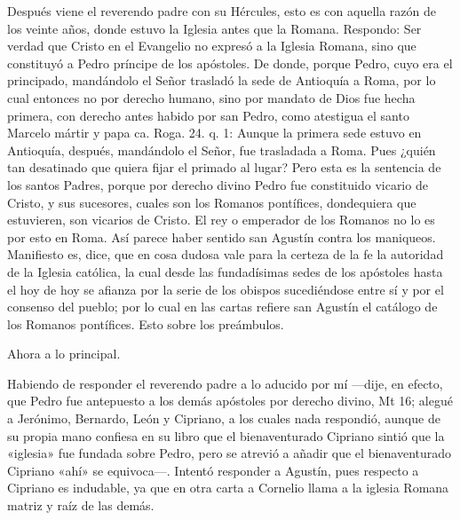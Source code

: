 Después viene el reverendo padre con su Hércules, esto es con aquella razón de los veinte años, donde estuvo la Iglesia antes que la Romana. Respondo: Ser verdad que Cristo en el Evangelio no expresó a la Iglesia Romana, sino que constituyó a Pedro príncipe de los apóstoles. De donde, porque Pedro, cuyo era el principado, mandándolo el Señor trasladó la sede de Antioquía a Roma, por lo cual entonces no por derecho humano, sino por mandato de Dios fue hecha primera, con derecho antes habido por san Pedro, como atestigua el santo Marcelo mártir y papa ca. Roga. 24. q. 1: Aunque la primera sede estuvo en Antioquía, después, mandándolo el Señor, fue trasladada a Roma. Pues ¿quién tan desatinado que quiera fijar el primado al lugar? Pero esta es la sentencia de los santos Padres, porque por derecho divino Pedro fue constituido vicario de Cristo, y sus sucesores, cuales son los Romanos pontífices, dondequiera que estuvieren, son vicarios de Cristo. El rey o emperador de los Romanos no lo es por esto en Roma. Así parece haber sentido san Agustín contra los maniqueos. Manifiesto es, dice, que en cosa dudosa vale para la certeza de la fe la autoridad de la Iglesia católica, la cual desde las fundadísimas sedes de los apóstoles hasta el hoy de hoy se afianza por la serie de los obispos sucediéndose entre sí y por el consenso del pueblo; por lo cual en las cartas refiere san Agustín el catálogo de los Romanos pontífices. Esto sobre los preámbulos.

Ahora a lo principal.

Habiendo de responder el reverendo padre a lo aducido por mí —dije, en efecto, que Pedro fue antepuesto a los demás apóstoles por derecho divino, Mt 16; alegué a Jerónimo, Bernardo, León y Cipriano, a los cuales nada respondió, aunque de su propia mano confiesa en su libro que el bienaventurado Cipriano sintió que la «iglesia» fue fundada sobre Pedro, pero se atrevió a añadir que el bienaventurado Cipriano «ahí» se equivoca—. Intentó responder a Agustín, pues respecto a Cipriano es indudable, ya que en otra carta a Cornelio llama a la iglesia Romana matriz y raíz de las demás.

